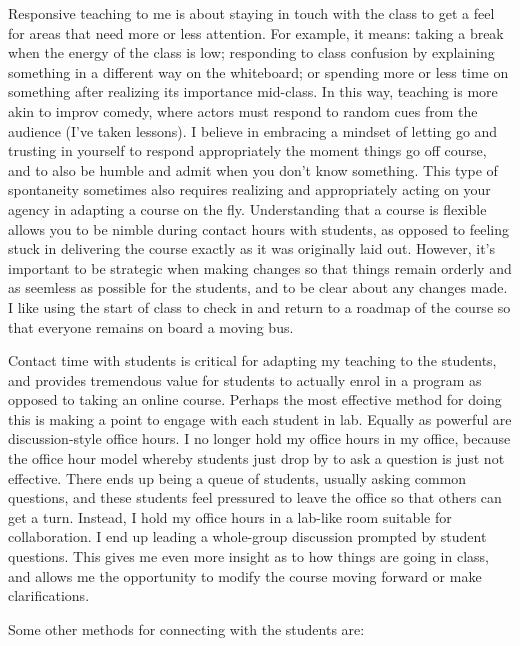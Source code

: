 \documentclass[]{article}
\begin{document}
Responsive teaching to me is about staying in touch with the class to get a feel for areas that need more or less attention. For example, it means: taking a break when the energy of the class is low; responding to class confusion by explaining something in a different way on the whiteboard; or spending more or less time on something after realizing its importance mid-class. In this way, teaching is more akin to improv comedy, where actors must respond to random cues from the audience (I've taken lessons). I believe in embracing a mindset of letting go and trusting in yourself to respond appropriately the moment things go off course, and to also be humble and admit when you don't know something. This type of spontaneity sometimes also requires realizing and appropriately acting on your agency in adapting a course on the fly. Understanding that a course is flexible allows you to be nimble during contact hours with students, as opposed to feeling stuck in delivering the course exactly as it was originally laid out. However, it's important to be strategic when making changes so that things remain orderly and as seemless as possible for the students, and to be clear about any changes made. I like using the start of class to check in and return to a roadmap of the course so that everyone remains on board a moving bus.

Contact time with students is critical for adapting my teaching to the students, and provides tremendous value for students to actually enrol in a program as opposed to taking an online course. Perhaps the most effective method for doing this is making a point to engage with each student in lab. Equally as powerful are discussion-style office hours. I no longer hold my office hours in my office, because the office hour model whereby students just drop by to ask a question is just not effective. There ends up being a queue of students, usually asking common questions, and these students feel pressured to leave the office so that others can get a turn. Instead, I hold my office hours in a lab-like room suitable for collaboration. I end up leading a whole-group discussion prompted by student questions. This gives me even more insight as to how things are going in class, and allows me the opportunity to modify the course moving forward or make clarifications.

Some other methods for connecting with the students are:
\end{document}
